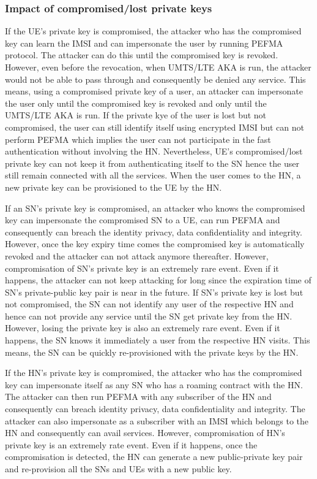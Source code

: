 \documentclass{river-journal}
\begin{document}
\subsubsection{Impact of compromised/lost private keys}
If the UE's private key is compromised, the attacker who has the compromised key can learn the IMSI and can impersonate the user by running PEFMA protocol. The attacker can do this until the compromised key is revoked. However, even before the revocation, when UMTS/LTE AKA is run, the attacker would not be able to pass through and consequently be denied any service. This means, using a compromised private key of a user, an attacker can impersonate the user only until the compromised key is revoked and only until the UMTS/LTE AKA is run. If the private kye of the user is lost but not compromised, the user can still identify itself using encrypted IMSI but can not perform PEFMA which implies the user can not participate in the fast authentication without involving the HN. Nevertheless, UE's compromised/lost private key can not keep it from authenticating itself to the SN hence the user still remain connected with all the services. When the user comes to the HN, a new private key can be provisioned to the UE by the HN.

If an SN's private key is compromised, an attacker who knows the compromised key can impersonate the compromised SN to a UE, can run PEFMA and consequently can breach the identity privacy, data confidentiality and integrity. However, once the key expiry time comes the compromised key is automatically revoked and the attacker can not attack anymore thereafter. However, compromisation of SN's private key is an extremely rare event. Even if it happens, the attacker can not keep attacking for long since the expiration time of SN's private-public key pair is near in the future. If SN's private key is lost but not compromised, the SN can not identify any user of the respective HN and hence can not provide any service until the SN get private key from the HN. However, losing the private key is also an extremely rare event. Even if it happens, the SN knows it immediately a user from the respective HN visits. This means, the SN can be quickly re-provisioned with the private keys by the HN.

If the HN's private key is compromised, the attacker who has the compromised key can impersonate itself as any SN who has a roaming contract with the HN. The attacker can then run PEFMA with any subscriber of the HN and consequently can breach identity privacy, data confidentiality and integrity. The attacker can also impersonate as a subscriber with an IMSI which belongs to the HN and consequently can avail services. However, compromisation of HN's private key is an extremely rate event. Even if it happens, once the compromisation is detected, the HN can generate a new public-private key pair and re-provision all the SNs and UEs with a new public key. 
\end{document}
